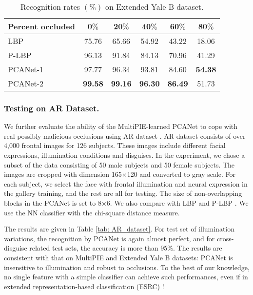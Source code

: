 \documentclass[10pt,journal,compsoc]{IEEEtran}
\begin{document}
\begin{table}\centering
\caption{Recognition rates $(\%)$ on Extended Yale B dataset.}
\begin{tabular}{l|c|c|c|c|c}
  \hline
Percent occluded & 0$\%$ & 20$\%$  & 40$\%$  & 60$\%$  & 80$\%$  \\ \hline \hline
  LBP \cite{Ahonen2006} & 75.76 & 65.66 & 54.92 & 43.22  & 18.06 \\
  P-LBP \cite{Tan2010}    & 96.13 & 91.84 & 84.13 & 70.96 & 41.29 \\ \hline
PCANet-1   & 97.77 & 96.34 & 93.81 & 84.60 & {\bf  54.38} \\
  PCANet-2   & {\bf 99.58} & {\bf  99.16} & {\bf 96.30} & {\bf 86.49} & 51.73 \\
  \hline
\end{tabular}\label{table: ExtendedYaleB}
\end{table}

\subsubsection{Testing on AR Dataset.}\label{sec: AR}
We further evaluate the ability of the MultiPIE-learned PCANet to cope with real possibly malicious occlusions using AR dataset \cite{Martinez1998}. AR dataset consists of over 4,000 frontal images for 126 subjects. These images include different facial expressions, illumination conditions and disguises. In the experiment, we chose a subset of the data consisting of 50 male subjects and 50 female subjects. The images are cropped with dimension 165$\times$120 and converted to gray scale. For each subject, we select the face with frontal illumination and neural expression in the gallery training, and the rest are all for testing. The size of non-overlapping blocks in the PCANet is set to 8$\times$6. We also compare with LBP \cite{Ahonen2006} and P-LBP \cite{Tan2010}. We use the NN classifier with the chi-square distance measure.

The results are given in Table \ref{tab: AR_dataset}. For test set of illumination variations, the recognition by PCANet is again almost perfect, and for cross-disguise related test sets, the accuracy is more than 95$\%$. The results are consistent with that on MultiPIE and Extended Yale B datasets: PCANet is insensitive to illumination and robust to occlusions. To the best of our knowledge, no single feature with a simple classifier can achieve such performances, even if in extended representation-based classification (ESRC) \cite{Deng2012}! 
\end{document}
